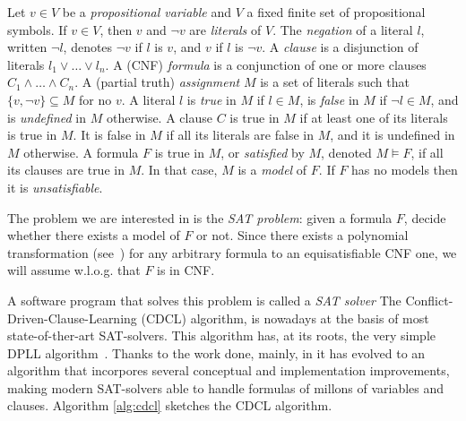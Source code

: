 \documentclass{llncs}
\begin{document}
Let $v \in V $ be a \emph{propositional variable} and $V$
 a fixed finite set of propositional symbols.  If $v \in V$,
then $v$ and $\lnot v$ are \emph{literals} of $V$.  
The \emph{negation} of a literal $l$, written $\lnot l$, denotes 
$\lnot v$ if $l$ is $v$, and $v$ if $l$ is $\lnot v$.
A \emph{clause} is a disjunction of literals $l_1 \lor\ldots\lor l_n$.
A (CNF) \emph{formula} is a conjunction of one or
more clauses $C_1 \land\ldots\land C_n$. 
 A (partial truth) \emph{assignment} $M$ is a
set of literals such that $\{ v, \lnot v \} \subseteq M$ for no $v$. A
literal $l$ is \emph{true} in $M$ if $l \in M$, is \emph{false} in $M$
if $\lnot l \in M$, and is \emph{undefined} in $M$ otherwise. 
A clause $C$ is true in $M$ if at least one of its
literals is true in $M$.  It is false in $M$ if all its literals are
false in $M$, and it is undefined in $M$ otherwise. 
A formula $F$ is true in $M$, or
\emph{satisfied} by $M$, denoted $M\models F$, if all its clauses are
true in $M$.  In that case, $M$ is a \emph{model} of $F$.  If $F$ has
no models then it is \emph{unsatisfiable}.  

The problem we are interested in is the \emph{SAT problem}: given a
formula $F$, decide whether there exists a model of $F$ or not.
Since there exists a polynomial transformation
(see~\cite{Tseitin1968}) for any arbitrary formula to an
equisatisfiable CNF one, we will assume w.l.o.g. that $F$ is in CNF.

A software program that solves this problem is called a \emph{SAT solver}
The Conflict-Driven-Clause-Learning (CDCL) algorithm, is nowadays at the 
basis of most state-of-ther-art SAT-solvers\cite{gluclose,plingeling,cryptominisat}. 
This algorithm has, at its roots, the very 
simple DPLL algorithm~\cite{Davisetal1962CACM}. Thanks to the work done, mainly,
 in \cite{relsat,Chaff2001,GRASP1999IEEE,ZhangStickel1996AIMATH,EenSorensson2003SAT,picosat2008} it has evolved
 to an algorithm that incorpores several conceptual and implementation 
improvements, making modern SAT-solvers able to handle formulas of millons 
of variables and clauses. Algorithm \ref{alg:cdcl} sketches the CDCL algorithm.
\end{document}
